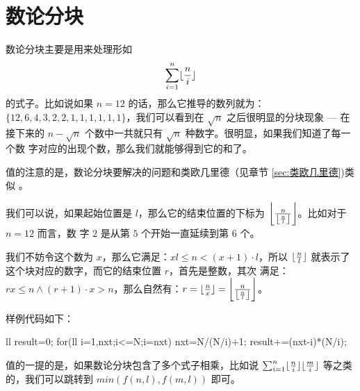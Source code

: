 \section{数论分块}
\label{sec:数论分块}



数论分块主要是用来处理形如
$$
    \sum^{n}_{i=1} \lfloor{n \over i}\rfloor
$$
的式子。比如说如果 $n = 12$ 的话，那么它推导的数列就为：$\{12, 6, 4, 3, 2, 2, 1,
1, 1, 1, 1, 1\}$，我们可以看到在 $\sqrt n$ 之后很明显的分块现象 --- 在接下来的
$n - \sqrt n$ 个数中一共就只有 $\sqrt n$ 种数字。很明显，如果我们知道了每一个数
字对应的出现个数，那么我们就能够得到它的和了。

值的注意的是，数论分块要解决的问题和类欧几里德（见章节 \ref{sec:类欧几里德})类似
。

我们可以说，如果起始位置是 $l$，那么它的结束位置的下标为 $\left\lfloor\frac{n}{
\left\lfloor{n \over l}\right\rfloor}\right\rfloor$。比如对于 $n = 12$ 而言，数
字 $2$ 是从第 $5$ 个开始一直延续到第 $6$ 个。

我们不妨令这个数为 $x$，那么它满足：$xl \le n < (x + 1)\cdot l$，所以 $\lfloor{n
\over l}\rfloor$ 就表示了这个块对应的数字，而它的结束位置 $r$，首先是整数，其次
满足：$rx \le n \land (r+1)\cdot x > n$，那么自然有：$r = \lfloor{n \over
x}\rfloor = \left\lfloor\frac{n}{\left\lfloor{n \over
l}\right\rfloor}\right\rfloor$。

样例代码如下：
\begin{Cpp}
{
  ll result=0;
  for(ll i=1,nxt;i<=N;i=nxt){
    nxt=N/(N/i)+1;
    result+=(nxt-i)*(N/i);
  }
}
\end{Cpp}

值的一提的是，如果数论分块包含了多个式子相乘，比如说 $\sum^{n}_{i=1} \lfloor{n
\over i}\rfloor\lfloor{m \over i}\rfloor$ 等之类的，我们可以跳转到 $min(f(n, l),
f(m, l))$ 即可。
